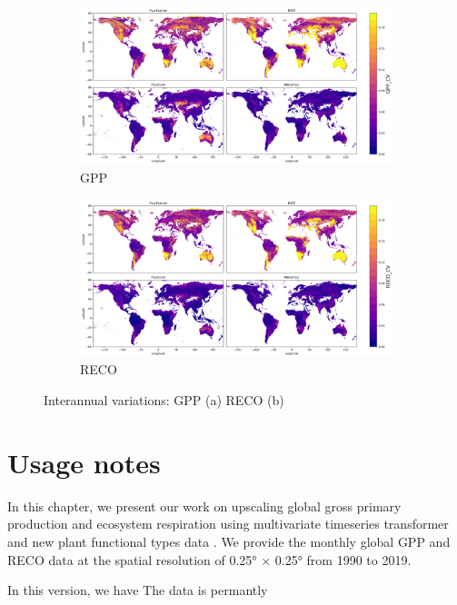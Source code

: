 \begin{figure}[p]
    \centering
    \begin{subfigure}{\textwidth}
      \centering
      \includegraphics[width=\textwidth]{figs/chap6/IAV_GPP.png}
      \caption{GPP}
      \label{fig:chap6_fig8a}
    \end{subfigure}

    \begin{subfigure}{\textwidth}
      \centering
      \includegraphics[width=\textwidth]{figs/chap6/IAV_RECO.png}
      \caption{RECO}
      \label{fig:chap6_fig8b}
    \end{subfigure}
    \caption{Interannual variations: GPP (a) RECO (b)}
    \label{fig:chap6_fig8}
\end{figure}
\section{Usage notes}
In this chapter, we present our work on upscaling global gross primary production and ecosystem respiration using multivariate timeseries transformer \citep{zerveas2021transformer} and new plant functional types data \citep{harper202229}. We provide the monthly global GPP and RECO data at the spatial resolution of 0.25° × 0.25° from 1990 to 2019. \par

In this version, we have  The data is permantly 